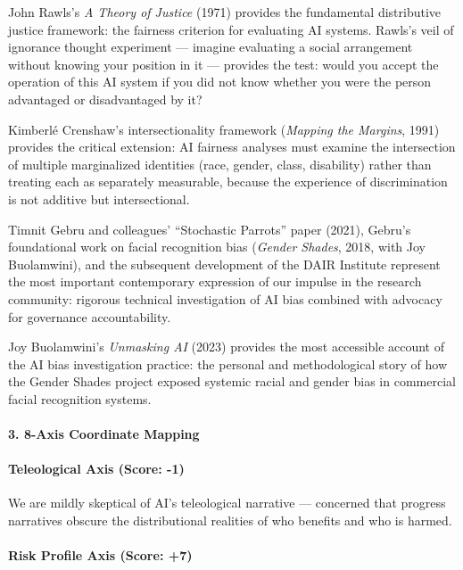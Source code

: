 John Rawls's \emph{A Theory of Justice} (1971) provides the fundamental
distributive justice framework: the fairness criterion for evaluating AI
systems. Rawls's veil of ignorance thought experiment --- imagine
evaluating a social arrangement without knowing your position in it ---
provides the test: would you accept the operation of this AI system if
you did not know whether you were the person advantaged or disadvantaged
by it?

Kimberlé Crenshaw's intersectionality framework (\emph{Mapping the
Margins}, 1991) provides the critical extension: AI fairness analyses
must examine the intersection of multiple marginalized identities (race,
gender, class, disability) rather than treating each as separately
measurable, because the experience of discrimination is not additive but
intersectional.

Timnit Gebru and colleagues' ``Stochastic Parrots'' paper (2021),
Gebru's foundational work on facial recognition bias (\emph{Gender
Shades}, 2018, with Joy Buolamwini), and the subsequent development of
the DAIR Institute represent the most important contemporary expression
of our impulse in the research community: rigorous technical
investigation of AI bias combined with advocacy for governance
accountability.

Joy Buolamwini's \emph{Unmasking AI} (2023) provides the most accessible
account of the AI bias investigation practice: the personal and
methodological story of how the Gender Shades project exposed systemic
racial and gender bias in commercial facial recognition systems.

\paragraph{3. 8-Axis Coordinate
Mapping}\label{axis-coordinate-mapping-10}

\paragraph{Teleological Axis (Score:
-1)}\label{teleological-axis-score--1-1}

We are mildly skeptical of AI's teleological narrative --- concerned
that progress narratives obscure the distributional realities of who
benefits and who is harmed.

\paragraph{Risk Profile Axis (Score:
+7)}\label{risk-profile-axis-score-7-2}

